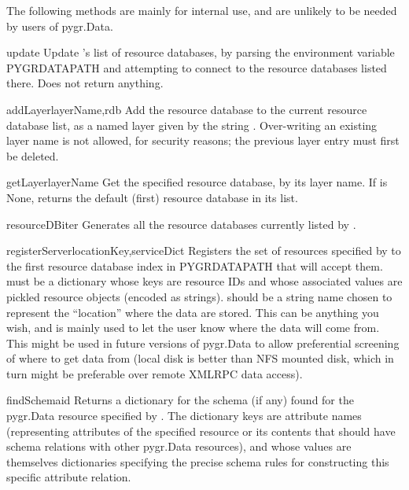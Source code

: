 \documentclass{howto}
\begin{document}
The following methods are mainly for internal use, and are unlikely to be
needed by users of pygr.Data.
\begin{funcdesc}{update}{}
  Update 's list of resource databases, by parsing the environment
  variable PYGRDATAPATH and attempting to connect to the resource databases
  listed there.  Does not return anything.
\end{funcdesc}

\begin{funcdesc}{addLayer}{layerName,rdb}
  Add the resource database  to the current resource database list,
  as a named layer given by the string .  Over-writing an 
  existing layer name is not allowed, for security reasons; 
  the previous layer entry must first be deleted.
\end{funcdesc}

\begin{funcdesc}{getLayer}{layerName}
  Get the specified resource database, by its layer name.  If 
  is None, returns the default (first) resource database in its list.
\end{funcdesc}

\begin{funcdesc}{resourceDBiter}{}
  Generates all the resource databases currently listed by .
\end{funcdesc}

\begin{funcdesc}{registerServer}{locationKey,serviceDict}
  Registers the set of resources specified by  to the
  first resource database index in PYGRDATAPATH that will accept them.
   must be a dictionary whose keys are resource IDs and
  whose associated values are pickled resource objects (encoded as strings).
   should be a string name chosen to represent the ``location''
  where the data are stored.  This can be anything you wish, and is mainly used
  to let the user know where the data will come from.  This might be used
  in future versions of pygr.Data to allow preferential screening of where
  to get data from (local disk is better than NFS mounted disk, which in turn
  might be preferable over remote XMLRPC data access).
\end{funcdesc}

\begin{funcdesc}{findSchema}{id}
  Returns a dictionary for the schema (if any) found for the pygr.Data resource 
  specified by .  The dictionary keys are attribute names (representing
  attributes of the specified resource or its contents that should have 
  schema relations with other pygr.Data resources), and whose values are
  themselves dictionaries specifying the precise schema rules for constructing
  this specific attribute relation.
\end{funcdesc}
\end{document}
